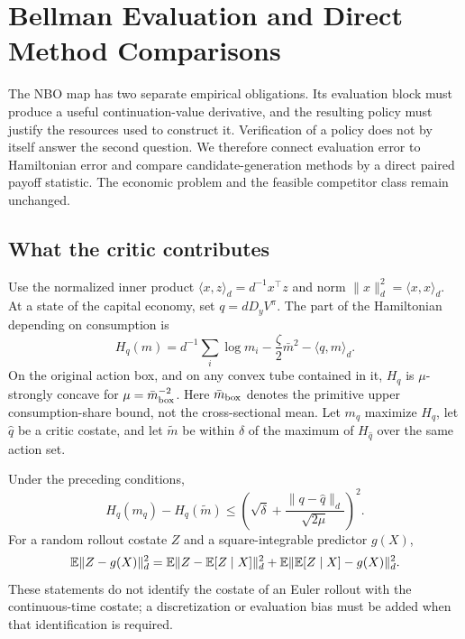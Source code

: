 \section{Bellman Evaluation and Direct Method Comparisons}\label{sec:r12theory}
The NBO map has two separate empirical obligations. Its evaluation block must produce a useful continuation-value derivative, and the resulting policy must justify the resources used to construct it. Verification of a policy does not by itself answer the second question. We therefore connect evaluation error to Hamiltonian error and compare candidate-generation methods by a direct paired payoff statistic. The economic problem and the feasible competitor class remain unchanged.

\subsection{What the critic contributes}
Use the normalized inner product $\langle x,z\rangle_d=d^{-1}x^\top z$ and norm $\|x\|_d^2=\langle x,x\rangle_d$. At a state of the capital economy, set $q=dD_yV^\pi$. The part of the Hamiltonian depending on consumption is
\[
 H_q(m)=d^{-1}\sum_i\log m_i-\frac\zeta2\bar m^2-\langle q,m\rangle_d.
\]
On the original action box, and on any convex tube contained in it, $H_q$ is $\mu$-strongly concave for $\mu=\bar m_{\rm box}^{-2}$. Here $\bar m_{\rm box}$ denotes the primitive upper consumption-share bound, not the cross-sectional mean. Let $m_q$ maximize $H_q$, let $\widehat q$ be a critic costate, and let $\widetilde m$ be within $\delta$ of the maximum of $H_{\widehat q}$ over the same action set.

\begin{proposition}\label{prop:r12costate}
Under the preceding conditions,
\begin{equation}\label{eq:r12actionloss}
 H_q(m_q)-H_q(\widetilde m)
 \leq\left(\sqrt\delta+\frac{\|q-\widehat q\|_d}{\sqrt{2\mu}}\right)^2.
\end{equation}
For a random rollout costate $Z$ and a square-integrable predictor $g(X)$,
\begin{equation}\label{eq:r12projection}
 \mathbb E\|Z-g(X)\|_d^2
 =\mathbb E\|Z-\mathbb E[Z\mid X]\|_d^2+
   \mathbb E\|\mathbb E[Z\mid X]-g(X)\|_d^2.
\end{equation}
These statements do not identify the costate of an Euler rollout with the continuous-time costate; a discretization or evaluation bias must be added when that identification is required.
\end{proposition}

